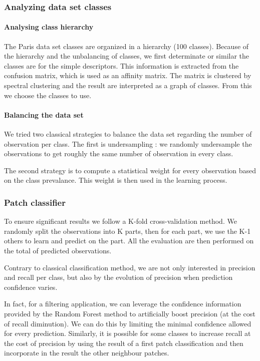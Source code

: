 		\subsubsection{Analyzing data set classes}
		\paragraph{Analysing class hierarchy} 
		The Paris data set classes are organized in a hierarchy (100 classes). 
		Because of the hierarchy and the unbalancing of classes, we first determinate or similar the classes are for the simple descriptors. This information is extracted from the confusion matrix, which is used as an affinity matrix. The matrix is clustered by spectral clustering and the result are interpreted as a graph of classes.
		From this we choose the classes to use.
		
		\paragraph{Balancing the data set} 
		We tried two classical strategies to balance the data set regarding the number of observation per class.
		The first is undersampling : we randomly undersample the observations to get roughly the same number of observation in every class.
		
		The second strategy is to compute a statistical weight for every observation based on the class prevalance. 
		This weight is then used in the learning process.
		
		
		\subsubsection{Patch classifier}
		
		
		To ensure significant results we follow a K-fold cross-validation method. 
		We randomly split the observations into K parts, then for each part, we use the K-1 others to learn and predict on the part.
		All the evaluation are then performed on the total of predicted observations.
		
		
		Contrary to classical classification method, we are not only interested in precision and recall per class, but also by the evolution of precision when prediction confidence varies.
		
		In fact, for a filtering application, we can leverage the confidence information provided by the Random Forest method to artificially boost precision (at the cost of recall diminution). We can do this by limiting the minimal confidence allowed for every prediction.
		Similarly, it is possible for some classes to increase recall at the cost of precision by using the result of a first patch classification and then incorporate in the result the other neighbour patches. 
		
